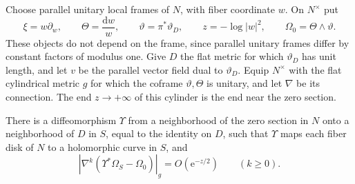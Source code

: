 Choose parallel unitary local frames of $N$, with fiber coordinate $w$. On $N^\times$ put
\[
 \xi=w\partial_w,\qquad \Theta=\frac{\mathrm dw}{w},\qquad
 \vartheta=\pi^*\vartheta_D,\qquad
 z=-\log|w|^2,\qquad \Omega_0=\Theta\wedge\vartheta.
\]
These objects do not depend on the frame, since parallel unitary frames differ by constant factors of modulus one. Give $D$ the flat metric for which $\vartheta_D$ has unit length, and let $v$ be the parallel vector field dual to $\vartheta_D$. Equip $N^\times$ with the flat cylindrical metric $g$ for which the coframe $\vartheta,\Theta$ is unitary, and let $\nabla$ be its connection. The end $z\to+\infty$ of this cylinder is the end near the zero section.

\begin{lemma}\label{lem:anticanonical-cylindrical-identification}
There is a diffeomorphism $\Upsilon$ from a neighborhood of the zero section in $N$ onto a neighborhood of $D$ in $S$, equal to the identity on $D$, such that $\Upsilon$ maps each fiber disk of $N$ to a holomorphic curve in $S$, and
\[
 |\nabla^k(\Upsilon^*\Omega_S-\Omega_0)|_g
 =O(\mathrm e^{-z/2})\qquad(k\geq0).
\]
\end{lemma}
